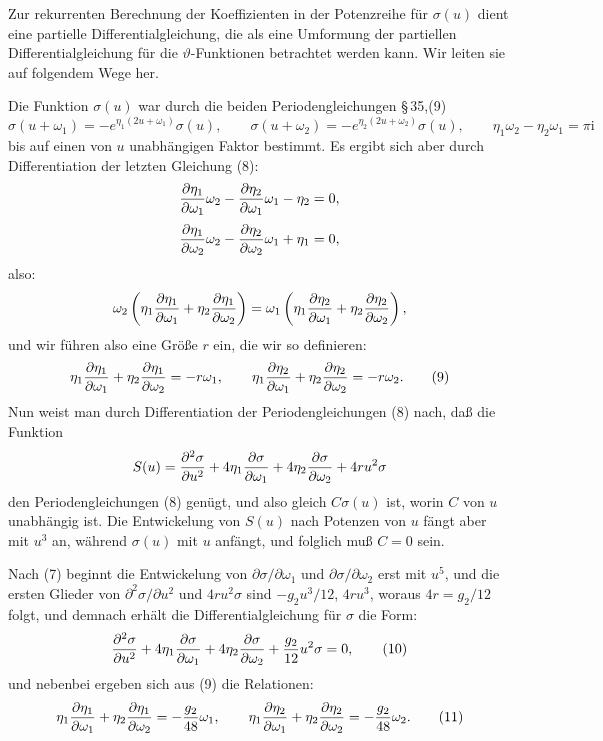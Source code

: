 \documentclass[11pt]{article}
\providecommand{\ii}{\mathrm{i}}
\begin{document}
Zur rekurrenten Berechnung der Koeffizienten in der Potenzreihe für $\sigma(u)$ dient eine partielle Differentialgleichung, die als eine Umformung der partiellen Differentialgleichung für die $\vartheta$-Funktionen betrachtet werden kann. Wir leiten sie auf folgendem Wege her.

Die Funktion $\sigma(u)$ war durch die beiden Periodengleichungen \S\,35,(9)
\begin{equation}
\sigma(u+\omega_1)=-e^{\eta_1(2u+\omega_1)}\sigma(u),
\qquad
\sigma(u+\omega_2)=-e^{\eta_2(2u+\omega_2)}\sigma(u),
\qquad
\eta_1\omega_2-\eta_2\omega_1=\pi\ii
\tag{8}
\end{equation}
bis auf einen von $u$ unabhängigen Faktor bestimmt. Es ergibt sich aber durch Differentiation der letzten Gleichung (8):
\[
{\partial\eta_1\over\partial\omega_1}\omega_2
-{\partial\eta_2\over\partial\omega_1}\omega_1-
\eta_2=0,
\]
\[
{\partial\eta_1\over\partial\omega_2}\omega_2
-{\partial\eta_2\over\partial\omega_2}\omega_1+
\eta_1=0,
\]
also:
\[
\omega_2\left(\eta_1{\partial\eta_1\over\partial\omega_1}+\eta_2{\partial\eta_1\over\partial\omega_2}\right)
=\omega_1\left(\eta_1{\partial\eta_2\over\partial\omega_1}+\eta_2{\partial\eta_2\over\partial\omega_2}\right),
\]
und wir führen also eine Größe $r$ ein, die wir so definieren:
\begin{equation}
\eta_1{\partial\eta_1\over\partial\omega_1}+\eta_2{\partial\eta_1\over\partial\omega_2}=-r\omega_1,
\qquad
\eta_1{\partial\eta_2\over\partial\omega_1}+\eta_2{\partial\eta_2\over\partial\omega_2}=-r\omega_2.
\tag{9}
\end{equation}
Nun weist man durch Differentiation der Periodengleichungen (8) nach, daß die Funktion
\[
S(u)={\partial^2\sigma\over\partial u^2}
+4\eta_1{\partial\sigma\over\partial\omega_1}
+4\eta_2{\partial\sigma\over\partial\omega_2}
+4ru^2\sigma
\]
den Periodengleichungen (8) genügt, und also gleich $C\sigma(u)$ ist, worin $C$ von $u$ unabhängig ist. Die Entwickelung von $S(u)$ nach Potenzen von $u$ fängt aber mit $u^3$ an, während $\sigma(u)$ mit $u$ anfängt, und folglich muß $C=0$ sein.

Nach (7) beginnt die Entwickelung von $\partial\sigma/\partial\omega_1$ und $\partial\sigma/\partial\omega_2$ erst mit $u^5$, und die ersten Glieder von $\partial^2\sigma/\partial u^2$ und $4ru^2\sigma$ sind $-g_2u^3/12$, $4ru^3$, woraus $4r=g_2/12$ folgt, und demnach erhält die Differentialgleichung für $\sigma$ die Form:
\begin{equation}
{\partial^2\sigma\over\partial u^2}
+4\eta_1{\partial\sigma\over\partial\omega_1}
+4\eta_2{\partial\sigma\over\partial\omega_2}
+{g_2\over12}u^2\sigma=0,
\tag{10}
\end{equation}
und nebenbei ergeben sich aus (9) die Relationen:
\begin{equation}
\eta_1{\partial\eta_1\over\partial\omega_1}+\eta_2{\partial\eta_1\over\partial\omega_2}=-{g_2\over48}\omega_1,
\qquad
\eta_1{\partial\eta_2\over\partial\omega_1}+\eta_2{\partial\eta_2\over\partial\omega_2}=-{g_2\over48}\omega_2.
\tag{11}
\end{equation}
\end{document}
